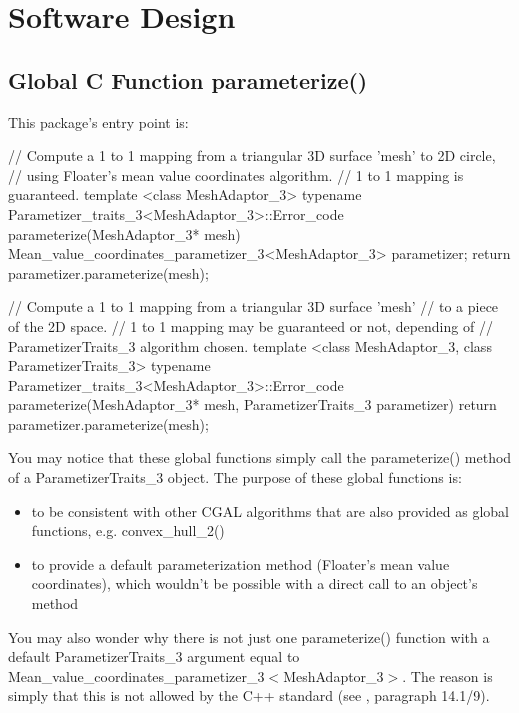\section{Software Design}

\subsection{Global C Function parameterize()}

This package's entry point is:

\begin{ccExampleCode}

// Compute a 1 to 1 mapping from a triangular 3D surface 'mesh' to 2D circle,
// using Floater's mean value coordinates algorithm.
// 1 to 1 mapping is guaranteed.
template <class MeshAdaptor_3>
typename Parametizer_traits_3<MeshAdaptor_3>::Error_code
parameterize(MeshAdaptor_3* mesh)
{
    Mean_value_coordinates_parametizer_3<MeshAdaptor_3> parametizer;
    return parametizer.parameterize(mesh);
}

// Compute a 1 to 1 mapping from a triangular 3D surface 'mesh'
// to a piece of the 2D space.
// 1 to 1 mapping may be guaranteed or not, depending of
// ParametizerTraits_3 algorithm chosen.
template <class MeshAdaptor_3, class ParametizerTraits_3>
typename Parametizer_traits_3<MeshAdaptor_3>::Error_code
parameterize(MeshAdaptor_3* mesh,
             ParametizerTraits_3 parametizer)
{
    return parametizer.parameterize(mesh);
}

\end{ccExampleCode}

You may notice that these global functions simply call the
parameterize() method of a ParametizerTraits\_3 object.
The purpose of these global functions is:
\begin{itemize}
\item to be consistent with other CGAL algorithms that are also provided as
      global functions, e.g. convex\_hull\_2()
\item to provide a default parameterization method (Floater's mean value coordinates),
      which wouldn't be possible with a direct call to an object's method
\end{itemize}

You may also wonder why there is not just one parameterize() function with a
default ParametizerTraits\_3 argument equal to
Mean\_value\_coordinates\_parametizer\_3$<$MeshAdaptor\_3$>$.
The reason is simply that this is not allowed by the C++ standard (see
\cite{cgal:ansi-is14882-98}, paragraph 14.1/9).


